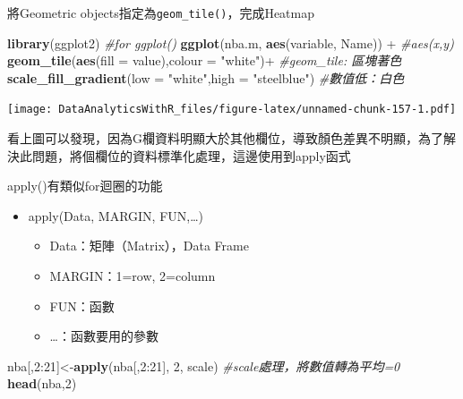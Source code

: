 \documentclass[]{book}
\newenvironment{Shaded}{\begin{snugshade}}{\end{snugshade}}
\newcommand{\KeywordTok}[1]{\textcolor[rgb]{0.13,0.29,0.53}{\textbf{{#1}}}}
\newcommand{\DataTypeTok}[1]{\textcolor[rgb]{0.13,0.29,0.53}{{#1}}}
\newcommand{\DecValTok}[1]{\textcolor[rgb]{0.00,0.00,0.81}{{#1}}}
\newcommand{\StringTok}[1]{\textcolor[rgb]{0.31,0.60,0.02}{{#1}}}
\newcommand{\CommentTok}[1]{\textcolor[rgb]{0.56,0.35,0.01}{\textit{{#1}}}}
\newcommand{\NormalTok}[1]{{#1}}
\providecommand{\tightlist}{%
  \setlength{\itemsep}{0pt}\setlength{\parskip}{0pt}}
\theoremstyle{definition}
\theoremstyle{definition}
\theoremstyle{remark}
\begin{document}
將Geometric objects指定為\texttt{geom\_tile()}，完成Heatmap

\begin{Shaded}
\begin{Highlighting}[]
\KeywordTok{library}\NormalTok{(ggplot2) }\CommentTok{#for ggplot()}
\KeywordTok{ggplot}\NormalTok{(nba.m, }\KeywordTok{aes}\NormalTok{(variable, Name)) +}\StringTok{ }\CommentTok{#aes(x,y)}
\StringTok{    }\KeywordTok{geom_tile}\NormalTok{(}\KeywordTok{aes}\NormalTok{(}\DataTypeTok{fill =} \NormalTok{value),}\DataTypeTok{colour =} \StringTok{"white"}\NormalTok{)+}\StringTok{ }\CommentTok{#geom_tile: 區塊著色}
\StringTok{    }\KeywordTok{scale_fill_gradient}\NormalTok{(}\DataTypeTok{low =} \StringTok{"white"}\NormalTok{,}\DataTypeTok{high =} \StringTok{"steelblue"}\NormalTok{) }\CommentTok{#數值低：白色}
\end{Highlighting}
\end{Shaded}

\texttt{[image: DataAnalyticsWithR\_files/figure-latex/unnamed-chunk-157-1.pdf]}

看上圖可以發現，因為G欄資料明顯大於其他欄位，導致顏色差異不明顯，為了解決此問題，將個欄位的資料標準化處理，這邊使用到apply函式

apply()有類似for迴圈的功能

\begin{itemize}
\tightlist
\item
  apply(Data, MARGIN, FUN,\ldots{})

  \begin{itemize}
  \tightlist
  \item
    Data：矩陣（Matrix），Data Frame
  \item
    MARGIN：1=row, 2=column
  \item
    FUN：函數
  \item
    \ldots{}：函數要用的參數
  \end{itemize}
\end{itemize}

\begin{Shaded}
\begin{Highlighting}[]
\NormalTok{nba[,}\DecValTok{2}\NormalTok{:}\DecValTok{21}\NormalTok{]<-}\KeywordTok{apply}\NormalTok{(nba[,}\DecValTok{2}\NormalTok{:}\DecValTok{21}\NormalTok{], }\DecValTok{2}\NormalTok{, scale) }\CommentTok{#scale處理，將數值轉為平均=0}
\KeywordTok{head}\NormalTok{(nba,}\DecValTok{2}\NormalTok{)}
\end{Highlighting}
\end{Shaded}
\end{document}
